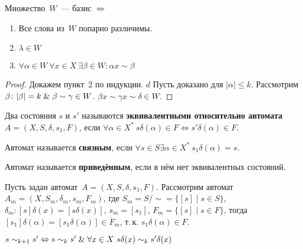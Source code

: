 \begin{theorem}
Множество~$W$~--- базис $\Leftrightarrow$
\begin{enumerate}
	\item Все слова из~$W$ попарно различимы.
	\item $\lambda \in W$
	\item $\forall \alpha \in W \ \forall x \in X \ \exists \beta \in W \colon \alpha x \sim \beta$
\end{enumerate}
\end{theorem}
\begin{proof}
Докажем пункт~2 по индукции.
	\indbase $d$
	\indstep Пусть доказано для $|\alpha| \leqslant k$.
	Рассмотрим $\beta \colon |\beta| = k \mathrel{\&} \beta \sim \gamma \in W$.
	$\beta x \sim \gamma x \sim \delta \in W$.
	\indend
\end{proof}

Два состояния $s$ и $s'$ называются \textbf{эквивалентными относительно автомата~$A = (X, S, \delta, s_1, F)$}, если $\forall \alpha \in X^* \ s \delta(\alpha) \in F \Leftrightarrow s' \delta(\alpha) \in F$.

Автомат называется \textbf{связным}, если $\forall s \in S \exists \alpha \in X^* \ s_1 \delta(\alpha) = s$.

Автомат называется \textbf{приведённым}, если в нём нет эквивалентных состояний.

Пусть задан автомат~$A = (X, S, \delta, s_1, F)$.
Рассмотрим автомат~$A_m = (X, S_m, \delta_m, s_m, F_m)$, где $S_m = S/\sim = \{ [s] \mid s \in S \}$, $\delta_m \colon [s] \delta(x) = [s \delta(x)]$, $s_m = [s_1]$, $F_m = \{ [s] \mid s \in F \}$,
тогда $[s_1] \delta(\alpha) = [s_1 \delta(\alpha)] \in F_m$, т.\,к. $s_1 \delta(\alpha) \in F$.

$s \sim_{k+1} s' \Leftrightarrow
s \sim_k s' \mathrel{\&} \forall x \in X \ s \delta(x) \sim_k s' \delta(x)$